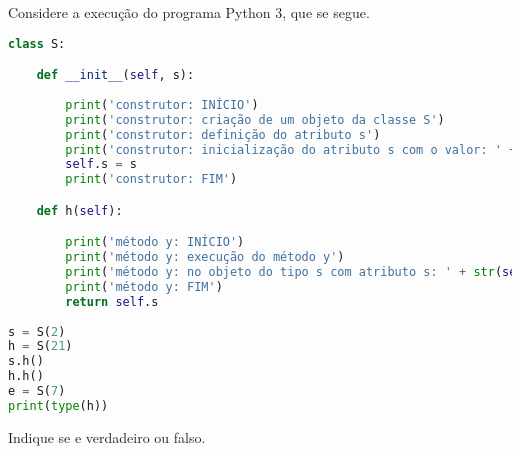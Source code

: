 \documentclass[12pt,varwidth=16cm,border=17pt]{standalone}
\begin{document}
Considere a execução do programa Python 3, que se segue. 

\begin{lstlisting}[language=Python]
class S:

    def __init__(self, s):
        
        print('construtor: INÍCIO')
        print('construtor: criação de um objeto da classe S')
        print('construtor: definição do atributo s')
        print('construtor: inicialização do atributo s com o valor: ' + str(s))
        self.s = s
        print('construtor: FIM')

    def h(self):

        print('método y: INÍCIO')
        print('método y: execução do método y')
        print('método y: no objeto do tipo s com atributo s: ' + str(self.s))
        print('método y: FIM')
        return self.s
    
s = S(2)
h = S(21)
s.h()
h.h()
e = S(7)
print(type(h))
\end{lstlisting}

Indique se e verdadeiro ou falso.
\end{document}
